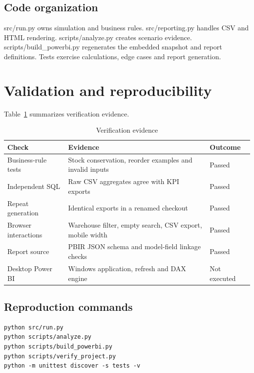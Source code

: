 \documentclass[conference,letterpaper]{IEEEtran}
\begin{document}
\subsection{Code organization}

src/run.py owns simulation and business rules. src/reporting.py handles CSV and HTML rendering. scripts/analyze.py creates scenario evidence. scripts/build\_powerbi.py regenerates the embedded snapshot and report definitions. Tests exercise calculations, edge cases and report generation.


\section{Validation and reproducibility}

Table~\ref{tab:6} summarizes verification evidence.

\begin{table}[H]
\caption{Verification evidence}\label{tab:6}
\centering\footnotesize
\setlength{\tabcolsep}{3pt}
\begin{tabularx}{\columnwidth}{>{\raggedright\arraybackslash}X >{\raggedright\arraybackslash}X >{\raggedright\arraybackslash}X}
\hline
\textbf{Check} & \textbf{Evidence} & \textbf{Outcome} \\
\hline
Business-rule tests & Stock conservation, reorder examples and invalid inputs & Passed \\
Independent SQL & Raw CSV aggregates agree with KPI exports & Passed \\
Repeat generation & Identical exports in a renamed checkout & Passed \\
Browser interactions & Warehouse filter, empty search, CSV export, mobile width & Passed \\
Report source & PBIR JSON schema and model-field linkage checks & Passed \\
Desktop Power BI & Windows application, refresh and DAX engine & Not executed \\
\hline
\end{tabularx}
\end{table}

\subsection{Reproduction commands}

\noindent\begin{minipage}{\columnwidth}
\begin{lstlisting}
python src/run.py
python scripts/analyze.py
python scripts/build_powerbi.py
python scripts/verify_project.py
python -m unittest discover -s tests -v
\end{lstlisting}
\end{minipage}
\end{document}
